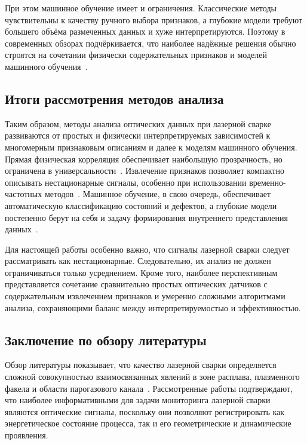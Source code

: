 При этом машинное обучение имеет и ограничения. Классические методы чувствительны к качеству ручного выбора признаков, а глубокие модели требуют большего объёма размеченных данных и хуже интерпретируются. Поэтому в современных обзорах подчёркивается, что наиболее надёжные решения обычно строятся на сочетании физически содержательных признаков и моделей машинного обучения~\cite{wu2022progress,huang2025laser,kouraytem2021modeling,CAI2022695}.

\subsection{Итоги рассмотрения методов анализа}

Таким образом, методы анализа оптических данных при лазерной сварке развиваются от простых и физически интерпретируемых зависимостей к многомерным признаковым описаниям и далее к моделям машинного обучения. Прямая физическая корреляция обеспечивает наибольшую прозрачность, но ограничена в универсальности~\cite{bruncko2003monitoring,sebestova2012non,konuk2011closed,mrvna2013correlation}. Извлечение признаков позволяет компактно описывать нестационарные сигналы, особенно при использовании временно-частотных методов~\cite{fang2004wavelet,vakili2017wavelet,6803929,sibillano2010plasma}. Машинное обучение, в свою очередь, обеспечивает автоматическую классификацию состояний и дефектов, а глубокие модели постепенно берут на себя и задачу формирования внутреннего представления данных~\cite{8756200,zhang2019low,ZHANG2019671,cao2023cross,zhang2019welding}.

Для настоящей работы особенно важно, что сигналы лазерной сварки следует рассматривать как нестационарные. Следовательно, их анализ не должен ограничиваться только усреднением. Кроме того, наиболее перспективным представляется сочетание сравнительно простых оптических датчиков с содержательным извлечением признаков и умеренно сложными алгоритмами анализа, сохраняющими баланс между интерпретируемостью и эффективностью.

\subsection{Заключение по обзору литературы}

Обзор литературы показывает, что качество лазерной сварки определяется сложной совокупностью взаимосвязанных явлений в зоне расплава, плазменного факела и области парогазового канала~\cite{wu2022progress,huang2025laser,konuk2011closed}. Рассмотренные работы подтверждают, что наиболее информативными для задачи мониторинга лазерной сварки являются оптические сигналы, поскольку они позволяют регистрировать как энергетическое состояние процесса, так и его геометрические и динамические проявления.


